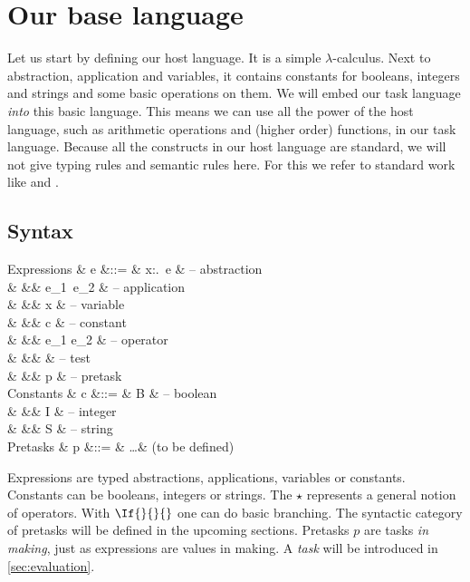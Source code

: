 
\section{Our base language}

Let us start by defining our host language.
It is a simple $\lambda$-calculus.
Next to abstraction, application and variables,
it contains constants for booleans, integers and strings
and some basic operations on them.
We will embed our task language \emph{into} this basic language.
This means we can use all the power of the host language,
such as arithmetic operations and (higher order) functions,
in our task language.
Because all the constructs in our host language are standard,
we will not give typing rules and semantic rules here.
For this we refer to standard work like \textcite{books/Pierce02TAPL} and \textcite{books/Harper16PFPL}.


\subsection{Syntax}
\label{sec:syntax}

\begin{grammar}
  Expressions
    & e &::= & \lambda x:\tau.\ e & – abstraction \\
    &   &\mid& e_1\ e_2           & – application \\
    &   &\mid& x                  & – variable \\
    &   &\mid& c                  & – constant \\
    &   &\mid& e_1 \star e_2      & – operator \\
    &   &\mid&  & – test \\
    &   &\mid& p                  & – pretask \\
  Constants
    & c &::= & B                  & – boolean \\
    &   &\mid& I                  & – integer \\
    &   &\mid& S                  & – string \\
  Pretasks
    & p &::= & \ldots             & (to be defined) \\
\end{grammar}
Expressions are typed abstractions, applications, variables or constants.
Constants can be booleans, integers or strings.
The $\star$ represents a general notion of operators.
With $\If{}{}{}$ one can do basic branching.
The syntactic category of pretasks will be defined in the upcoming sections.
Pretasks $p$ are tasks \emph{in making},
just as expressions are values in making.
A \emph{task} will be introduced in \autoref{sec:evaluation}.

